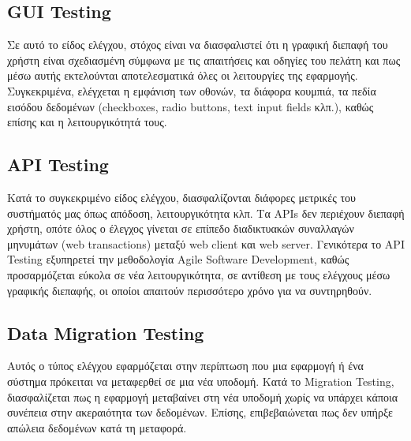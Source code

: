 \subsection*{GUI Testing}
Σε αυτό το είδος ελέγχου, στόχος είναι να διασφαλιστεί ότι η γραφική διεπαφή του χρήστη είναι σχεδιασμένη σύμφωνα με τις απαιτήσεις και οδηγίες 
του πελάτη και πως μέσω αυτής εκτελούνται αποτελεσματικά όλες οι λειτουργίες της εφαρμογής. Συγκεκριμένα, ελέγχεται η εμφάνιση των οθονών, τα 
διάφορα κουμπιά, τα πεδία εισόδου δεδομένων (checkboxes, radio buttons, text input fields κλπ.), καθώς επίσης και η λειτουργικότητά τους.

\subsection*{API Testing}
Κατά το συγκεκριμένο είδος ελέγχου, διασφαλίζονται διάφορες μετρικές του συστήματός μας όπως απόδοση, λειτουργικότητα κλπ. Τα APIs δεν 
περιέχουν διεπαφή χρήστη, οπότε όλος ο έλεγχος γίνεται σε επίπεδο διαδικτυακών συναλλαγών μηνυμάτων (web transactions) μεταξύ web client και 
web server. Γενικότερα το API Testing εξυπηρετεί την μεθοδολογία Agile Software Development, καθώς προσαρμόζεται εύκολα σε νέα λειτουργικότητα, 
σε αντίθεση με τους ελέγχους μέσω γραφικής διεπαφής, οι οποίοι απαιτούν περισσότερο χρόνο για να συντηρηθούν.

\subsection*{Data Migration Testing}
Αυτός ο τύπος ελέγχου εφαρμόζεται στην περίπτωση που μια εφαρμογή ή ένα σύστημα πρόκειται να μεταφερθεί σε μια νέα υποδομή. Κατά το Migration 
Testing, διασφαλίζεται πως η εφαρμογή μεταβαίνει στη νέα υποδομή χωρίς να υπάρχει κάποια συνέπεια στην ακεραιότητα των δεδομένων. Επίσης, 
επιβεβαιώνεται πως δεν υπήρξε απώλεια δεδομένων κατά τη μεταφορά.

